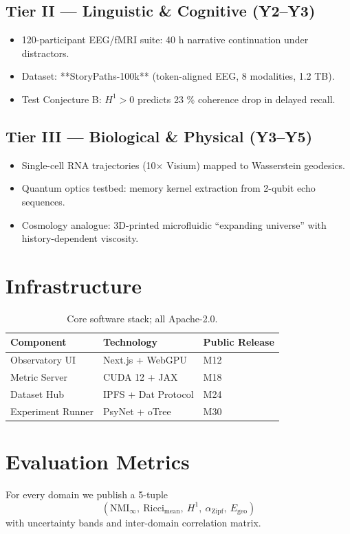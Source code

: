 \documentclass[12pt,a4paper]{article}
\theoremstyle{definition}
\begin{document}
\subsection{Tier II — Linguistic \& Cognitive (Y2–Y3)}
\begin{itemize}
  \item 120-participant EEG/fMRI suite: 40 h narrative continuation under distractors.
  \item Dataset: **StoryPaths-100k** (token-aligned EEG, 8 modalities, 1.2 TB).
  \item Test Conjecture B: $H^1>0$ predicts 23 \% coherence drop in delayed recall.
\end{itemize}

\subsection{Tier III — Biological \& Physical (Y3–Y5)}
\begin{itemize}
  \item Single-cell RNA trajectories (10× Visium) mapped to Wasserstein geodesics.
  \item Quantum optics testbed: memory kernel extraction from 2-qubit echo sequences.
  \item Cosmology analogue: 3D-printed microfluidic “expanding universe” with history-dependent viscosity.
\end{itemize}

\section{Infrastructure}
\begin{table}[ht]
\centering
\begin{tabular}{@{}l l l@{}}
\toprule
Component & Technology & Public Release \\
\midrule
Observatory UI & Next.js + WebGPU & M12 \\
Metric Server & CUDA 12 + JAX & M18 \\
Dataset Hub & IPFS + Dat Protocol & M24 \\
Experiment Runner & PsyNet + oTree & M30 \\
\bottomrule
\end{tabular}
\caption{Core software stack; all Apache-2.0.}
\label{tab:stack}
\end{table}

\section{Evaluation Metrics}
For every domain we publish a 5-tuple  
\[
(\mathrm{NMI}_\infty,\ \mathrm{Ricci}_\mathrm{mean},\ H^1,\ \alpha_\mathrm{Zipf},\ E_\mathrm{geo})
\]
with uncertainty bands and inter-domain correlation matrix.
\end{document}
